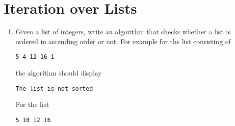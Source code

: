 \documentclass[11pt,a4paper]{article}
\begin{document}
\section{Iteration over Lists}
\begin{enumerate}[label=(\alph*)]
  \item Given a list of integers, write an algorithm that checks whether a list is ordered in ascending order
or not.
For example for the list consisting of
\begin{verbatim}
5 4 12 16 1
\end{verbatim}
the algorithm should display
\begin{verbatim}
The list is not sorted
\end{verbatim}
For the list
\begin{verbatim}
5 10 12 16
\end{verbatim}


\end{enumerate}
\end{document}
